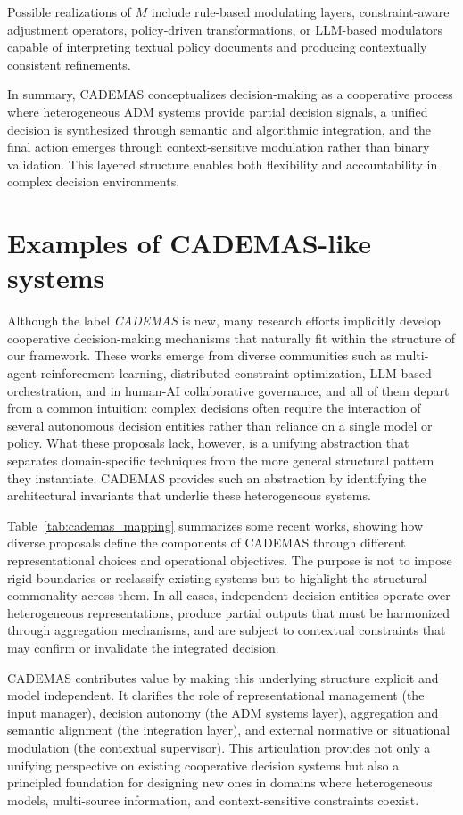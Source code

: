 \documentclass[letterpaper, 10 pt,conference]{IEEEconf}
\begin{document}
Possible realizations of $M$ include rule-based modulating layers,  constraint-aware adjustment operators, policy-driven transformations, or LLM-based modulators capable of interpreting textual policy documents and producing contextually consistent refinements.

In summary, CADEMAS conceptualizes decision-making as a cooperative process where heterogeneous ADM systems provide partial decision signals, a unified decision is synthesized through semantic and algorithmic integration, and the final action emerges through context-sensitive modulation rather than binary validation. This layered structure enables both flexibility and accountability in complex decision environments.


\section{Examples of CADEMAS-like systems\label{sect:examples}}

Although the label \emph{CADEMAS} is new, many research efforts implicitly develop cooperative decision-making mechanisms that naturally fit within the structure of our framework. These works emerge from diverse communities such as multi-agent reinforcement learning, distributed constraint optimization, LLM-based orchestration, and in human-AI collaborative governance, and all of them depart from a common intuition: complex decisions often require the interaction of several autonomous decision entities rather than reliance on a single model or policy. What these proposals lack, however, is a unifying abstraction that separates domain-specific techniques from the more general structural pattern they instantiate. CADEMAS provides such an abstraction by identifying the architectural invariants that underlie these heterogeneous systems.

Table~\ref{tab:cademas_mapping} summarizes some recent works, showing how diverse proposals define the components of CADEMAS through different representational choices and operational objectives. The purpose is not to impose rigid boundaries or reclassify existing systems but to highlight the structural commonality across them. In all cases, independent decision entities operate over heterogeneous representations, produce partial outputs that must be harmonized through aggregation mechanisms, and are subject to contextual constraints that may confirm or invalidate the integrated decision.

CADEMAS contributes value by making this underlying structure explicit and model independent. It clarifies the role of representational management (the input manager), decision autonomy (the ADM systems layer), aggregation and semantic alignment (the integration layer), and external normative or situational modulation (the contextual supervisor). This articulation provides not only a unifying perspective on existing cooperative decision systems but also a principled foundation for designing new ones in domains where heterogeneous models, multi-source information, and context-sensitive constraints coexist.
\end{document}
